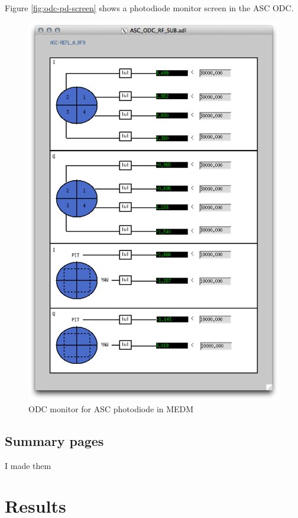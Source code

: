 Figure \ref{fig:odc-pd-screen} shows a photodiode monitor screen in the ASC ODC. 

\begin{figure}[ht!]
\includegraphics[width=\textwidth]{figures/ODC/PD_screen}
\caption[ASC ODC Photodiode Monitor in MEDM]{ODC monitor for ASC photodiode in MEDM}
\end{figure}\label{fig:odc-pd-screen}

\subsection{Summary pages}
I made them

\section{Results}

